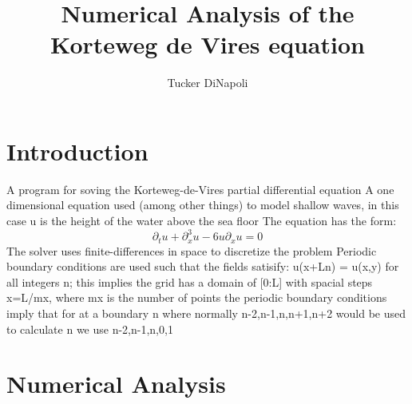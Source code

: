 \documentclass[twoculumn]{article}
\author{Tucker DiNapoli}
\title{Numerical Analysis of the Korteweg de Vires equation}
\begin{document}
\maketitle
\section{Introduction}
A program for soving the Korteweg-de-Vires partial differential equation
A one dimensional equation used (among other things) to model shallow waves,
in this case u is the height of the water above the sea floor
The equation has the form:
\[\partial_tu+\partial_x^3u-6u\partial_xu=0\]
The solver uses finite-differences in space to discretize the problem
Periodic boundary conditions are used such that the fields satisify:
u(x+Ln) = u(x,y) for all integers n; this implies the grid has a domain of
[0:L] with spacial steps \Delta x=L/mx, where mx is the number of points
the periodic boundary conditions imply that for at a boundary n where
normally n-2,n-1,n,n+1,n+2 would be used to calculate n we use
n-2,n-1,n,0,1

\section{Numerical Analysis}
\end{document}

